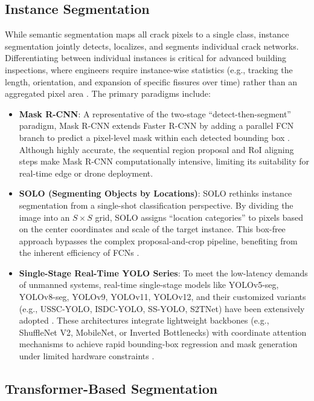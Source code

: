 \subsection{Instance Segmentation}

\hs While semantic segmentation maps all crack pixels to a single class, instance segmentation jointly detects, localizes, and segments individual crack networks. Differentiating between individual instances is critical for advanced building inspections, where engineers require instance-wise statistics (e.g., tracking the length, orientation, and expansion of specific fissures over time) rather than an aggregated pixel area \cite{zhao-2026}. The primary paradigms include:
\begin{itemize}
    \item \textbf{Mask R-CNN}: A representative of the two-stage ``detect-then-segment'' paradigm, Mask R-CNN extends Faster R-CNN by adding a parallel FCN branch to predict a pixel-level mask within each detected bounding box \cite{wang-2019,zhao-2026}. Although highly accurate, the sequential region proposal and RoI aligning steps make Mask R-CNN computationally intensive, limiting its suitability for real-time edge or drone deployment.
    \item \textbf{SOLO (Segmenting Objects by Locations)}: SOLO rethinks instance segmentation from a single-shot classification perspective. By dividing the image into an $S \times S$ grid, SOLO assigns ``location categories'' to pixels based on the center coordinates and scale of the target instance. This box-free approach bypasses the complex proposal-and-crop pipeline, benefiting from the inherent efficiency of FCNs \cite{wang-2019}.
    \item \textbf{Single-Stage Real-Time YOLO Series}: To meet the low-latency demands of unmanned systems, real-time single-stage models like YOLOv5-seg, YOLOv8-seg, YOLOv9, YOLOv11, YOLOv12, and their customized variants (e.g., USSC-YOLO, ISDC-YOLO, SS-YOLO, S2TNet) have been extensively adopted \cite{zhang-2024a,chen-2026,kucukayan-2024,wang-2025,sohaib-2024}. These architectures integrate lightweight backbones (e.g., ShuffleNet V2, MobileNet, or Inverted Bottlenecks) with coordinate attention mechanisms to achieve rapid bounding-box regression and mask generation under limited hardware constraints \cite{zhang-2024a,sohaib-2024,wang-2025}.
\end{itemize}

\subsection{Transformer-Based Segmentation}

